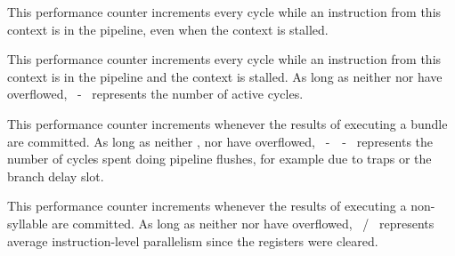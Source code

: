
This performance counter increments every cycle while an instruction from this 
context is in the pipeline, even when the context is stalled.

\implementation{}


This performance counter increments every cycle while an instruction from this 
context is in the pipeline and the context is stalled. As long as neither 
 nor  have overflowed, ~-~ 
represents the number of active cycles.

\implementation{}


This performance counter increments whenever the results of executing a bundle 
are committed. As long as neither ,  nor  have 
overflowed, ~-~~-~ represents the number of 
cycles spent doing pipeline flushes, for example due to traps or the branch 
delay slot.

\implementation{}


This performance counter increments whenever the results of executing a 
non- syllable are committed. As long as neither  nor 
 have overflowed, ~/~ represents average 
instruction-level parallelism since the registers were cleared.

